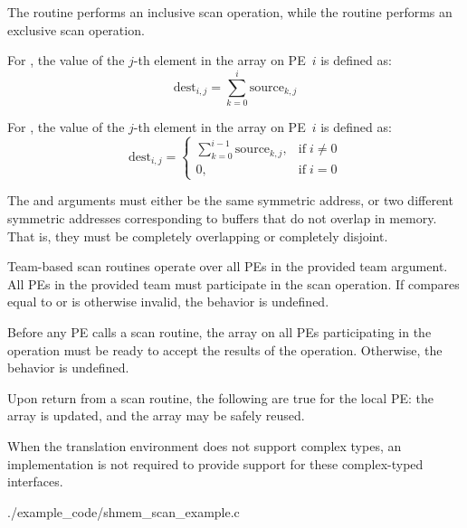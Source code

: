 \begin{apidefinition}
{  The  routine performs an inclusive scan
  operation, while the  routine performs an
  exclusive scan operation.

  For , the value of the $j$-th element in
  the  array on \ac{PE}~$i$ is defined as:
  \begin{equation*}
    \textrm{dest}_{i,j} = \displaystyle\sum_{k=0}^{i} \textrm{source}_{k,j}
  \end{equation*}

  For , the value of the $j$-th element in
  the  array on \ac{PE}~$i$ is defined as:
  \begin{equation*}
    \textrm{dest}_{i,j} =
    \begin{cases}
    \displaystyle\sum_{k=0}^{i-1} \textrm{source}_{k,j}, & \text{if} \; i \neq 0 \\
    0,  & \text{if} \; i = 0
    \end{cases}
  \end{equation*}

  The \source{} and \dest{} arguments must either be the same
  symmetric address, or two different symmetric addresses
  corresponding to buffers that do not overlap in memory. That is,
  they must be completely overlapping or completely disjoint.

  Team-based scan routines operate over all \acp{PE} in the provided
  team argument. All \acp{PE} in the provided team must participate in
  the scan operation.  If  compares equal to
   or is otherwise invalid, the
  behavior is undefined.

  Before any \ac{PE} calls a scan routine, the \dest{} array on all
  \acp{PE} participating in the operation must be ready to accept the
  results of the operation.  Otherwise, the behavior is undefined.

  Upon return from a scan routine, the following are true for the
  local \ac{PE}: the \dest{} array is updated, and the \source{} array
  may be safely reused.

  When the \Cstd translation environment does not support complex
  types, an \openshmem implementation is not required to provide
  support for these complex-typed interfaces.
}


\begin{apiexamples}

  {./example_code/shmem_scan_example.c}
  {}

\end{apiexamples}

\end{apidefinition}
